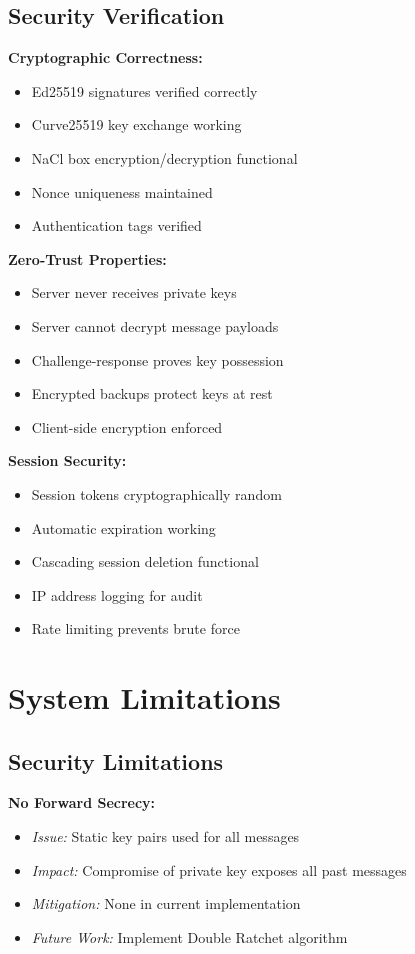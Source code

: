 \subsection{Security Verification}

\textbf{Cryptographic Correctness:}
\begin{itemize}
    \item Ed25519 signatures verified correctly
    \item Curve25519 key exchange working
    \item NaCl box encryption/decryption functional
    \item Nonce uniqueness maintained
    \item Authentication tags verified
\end{itemize}

\textbf{Zero-Trust Properties:}
\begin{itemize}
    \item Server never receives private keys
    \item Server cannot decrypt message payloads
    \item Challenge-response proves key possession
    \item Encrypted backups protect keys at rest
    \item Client-side encryption enforced
\end{itemize}

\textbf{Session Security:}
\begin{itemize}
    \item Session tokens cryptographically random
    \item Automatic expiration working
    \item Cascading session deletion functional
    \item IP address logging for audit
    \item Rate limiting prevents brute force
\end{itemize}

\section{System Limitations}

\subsection{Security Limitations}

\textbf{No Forward Secrecy:}
\begin{itemize}
    \item \textit{Issue:} Static key pairs used for all messages
    \item \textit{Impact:} Compromise of private key exposes all past messages
    \item \textit{Mitigation:} None in current implementation
    \item \textit{Future Work:} Implement Double Ratchet algorithm
\end{itemize}

